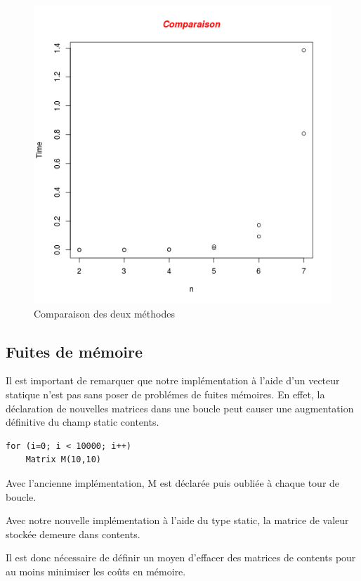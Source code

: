 \documentclass[a4paper,11pt]{article}
\begin{document}
\begin{figure}
  \centering
  \includegraphics[scale=0.5]{Comparison.png}
  \caption{Comparaison des deux méthodes}
  \label{fig:phd}
\end{figure}


\subsection{Fuites de mémoire}

Il est important de remarquer que notre implémentation à l'aide d'un vecteur statique n'est pas sans poser de problémes de fuites mémoires.
En effet, la déclaration de nouvelles matrices dans une boucle peut causer une augmentation définitive du champ static contents.

\begin{lstlisting}
for (i=0; i < 10000; i++)
    Matrix M(10,10)
\end{lstlisting}

Avec l'ancienne implémentation, M est déclarée puis oubliée à chaque tour de boucle.

Avec notre nouvelle implémentation à l'aide du type static, la matrice de valeur stockée demeure dans contents.

Il est donc nécessaire de définir un moyen d'effacer des matrices de contents pour au moins minimiser les coûts en mémoire.
\end{document}
